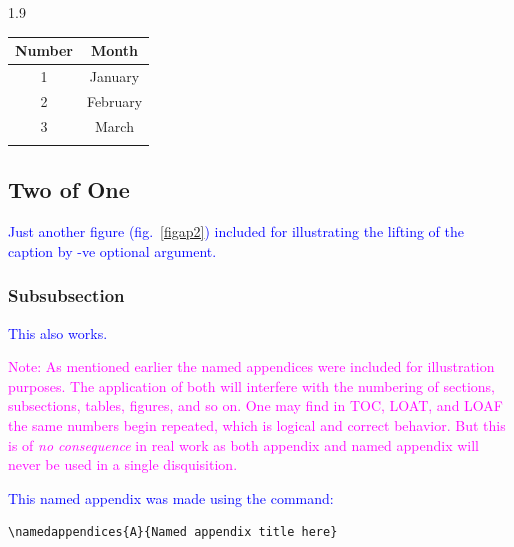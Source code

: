 \documentclass[phd]{ndsu-thesis-2022}
\newcommand\myspacing{1.9}      %
\newcommand\italk[1]{\textcolor{blue}{#1}}  %
\begin{document}
\begin{spacing}{\myspacing}
\begin{appendixtable}[h]
\centering
\caption{One appendix full-width table captions go at the top of the table.}
\setlength\tabcolsep{1.3in}
\begin{tabular}{cc}
\toprule
Number & Month \\
\midrule
1 & January \\
2 & February \\
3 & March\\
\bottomrule
\label{aptab1}
\end{tabular}
\end{appendixtable}

\subsection{Two of One}

\italk{Just another figure (fig.~\ref{figap2}) included for illustrating the lifting of the caption by -ve optional argument. }


\subsubsection{Subsubsection}
\italk{This also works.}



\textcolor{magenta}{Note: As mentioned earlier the named appendices were included for illustration purposes. The application of both will interfere with the numbering of sections, subsections, tables, figures, and so on. One may find in TOC, LOAT, and LOAF the same numbers begin repeated, which is logical and correct behavior. But this is of \emph{no consequence} in real work as both appendix and named appendix will never be used in a single disquisition.}

\italk{This named appendix was made using the command:}

\begin{verbatim}
\namedappendices{A}{Named appendix title here}
\end{verbatim}


\end{spacing}
\end{document}
